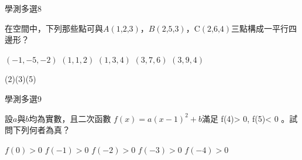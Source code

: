 \begin{QUESTIONS}
    \begin{QUESTION}
        \begin{ExamInfo}{87}{學測}{多選}{8}
        \end{ExamInfo}
        \begin{ExamAnsRateInfo}{}{}{}{}
        \end{ExamAnsRateInfo}
        \begin{QBODY}
            在空間中，下列那些點可與$A\left( \text{1,2,3} \right)$，$B\left( \text{2,5,3} \right)$，$\text{C}\left( \text{2,6,4} \right)$三點構成一平行四邊形？
            \begin{QOPS}
                \QOP $\left(  -1,-5,-2 \right)$	
                \QOP $\left( 1,1,2 \right)$
                \QOP $\left( 1,3,4 \right)$	
                \QOP $\left( 3,7,6 \right)$
                \QOP $\left( 3,9,4 \right)$
            \end{QOPS}
        \end{QBODY}
        \begin{QFROMS}
        \end{QFROMS}
        \begin{QTAGS}\end{QTAGS}
        \begin{QANS}
            (2)(3)(5)
        \end{QANS}
        \begin{QSOLLIST}
        \end{QSOLLIST}
        \begin{QEMPTYSPACE}
        \end{QEMPTYSPACE}
    \end{QUESTION}
    \begin{QUESTION}
        \begin{ExamInfo}{87}{學測}{多選}{9}
        \end{ExamInfo}
        \begin{ExamAnsRateInfo}{}{}{}{}
        \end{ExamAnsRateInfo}
        \begin{QBODY}
            設$a$與$b$均為實數，且二次函數 $f\left( x \right)=a{{\left( x-1 \right)}^{2}}+b$滿足 f(4)> 0, f(5)< 0 。試問下列何者為真？
            \begin{QOPS}
                \QOP $ f(0) >0$	
                \QOP $ f(-1)>0$
                \QOP $ f(-2)>0$	
                \QOP $ f(-3)>0$
                \QOP $ f(-4)>0$
            \end{QOPS}            
        \end{QBODY}

\end{QUESTION}
\end{QUESTIONS}
